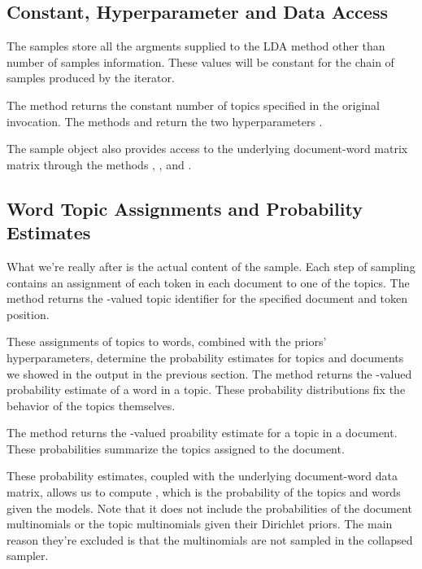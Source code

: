 \subsection{Constant, Hyperparameter and Data Access}

The samples store all the argments supplied to the LDA method other
than number of samples information.  These values will be constant
for the chain of samples produced by the iterator.

The method  returns the constant number of topics
specified in the original invocation.  The methods
 and  return the two
hyperparameters .

The sample object also provides access to the underlying document-word
matrix matrix through the methods ,
, and .

\subsection{Word Topic Assignments and Probability Estimates}

What we're really after is the actual content of the sample.  Each
step of sampling contains an assignment of each token in each document
to one of the topics.  The method  returns
the -valued topic identifier for the specified document
and token position.

These assignments of topics to words, combined with the priors'
hyperparameters, determine the probability estimates for topics and
documents we showed in the output in the previous section.  The method
 returns the -valued
probability estimate of a word in a topic.  These probability
distributions fix the behavior of the topics themselves.

The method  returns the
-valued proability estimate for a topic in a document.
These probabilities summarize the topics assigned to the document.

These probability estimates, coupled with the underlying document-word
data matrix, allows us to compute ,
which is the probability of the topics and words given the models.
Note that it does not include the probabilities of the document
multinomials or the topic multinomials given their Dirichlet priors.
The main reason they're excluded is that the multinomials are not
sampled in the collapsed sampler.


